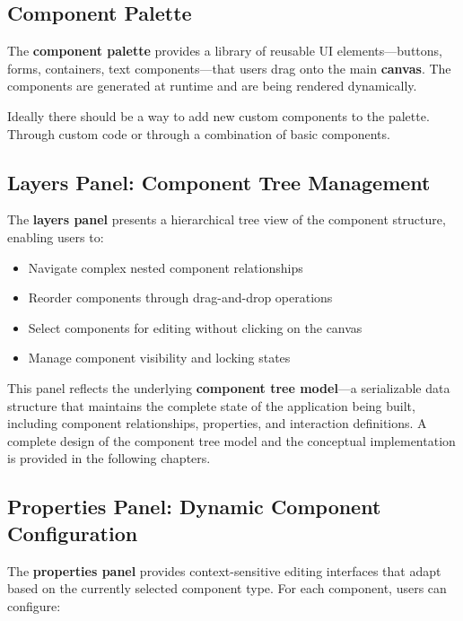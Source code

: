 \documentclass[oneside,12pt]{book}
\begin{document}
\subsection{Component Palette}

The \textbf{component palette} provides a library of reusable UI elements—buttons, forms, containers, text components—that users drag onto the main \textbf{canvas}.
The components are generated at runtime and are being rendered dynamically.

Ideally there should be a way to add new custom components to the palette. Through custom code or through a combination of basic components.

\subsection{Layers Panel: Component Tree Management}

The \textbf{layers panel} presents a hierarchical tree view of the component structure, enabling users to:

\begin{itemize}
    \item Navigate complex nested component relationships
    \item Reorder components through drag-and-drop operations
    \item Select components for editing without clicking on the canvas
    \item Manage component visibility and locking states
\end{itemize}

This panel reflects the underlying \textbf{component tree model}—a serializable data structure that maintains the complete state of the application being built, including component relationships, properties, and interaction definitions. A complete design of the component tree model and the conceptual implementation is provided in the following chapters.

\newpage
\subsection{Properties Panel: Dynamic Component Configuration}

The \textbf{properties panel} provides context-sensitive editing interfaces that adapt based on the currently selected component type. For each component, users can configure:
\end{document}

